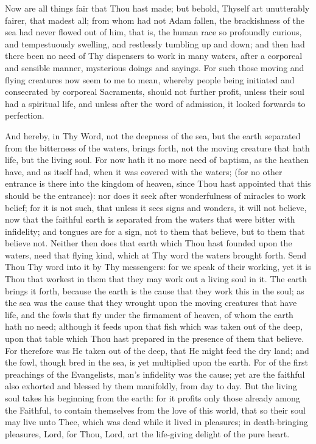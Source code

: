 \documentclass[b5paper,openright,12pt,twoside]{book}
\begin{document}
Now are all things fair that Thou hast made; but behold, Thyself art
unutterably fairer, that madest all; from whom had not Adam fallen, the
brackishness of the sea had never flowed out of him, that is, the human
race so profoundly curious, and tempestuously swelling, and restlessly
tumbling up and down; and then had there been no need of Thy dispensers
to work in many waters, after a corporeal and sensible manner,
mysterious doings and sayings. For such those moving and flying
creatures now seem to me to mean, whereby people being initiated and
consecrated by corporeal Sacraments, should not further profit, unless
their soul had a spiritual life, and unless after the word of admission,
it looked forwards to perfection.

And hereby, in Thy Word, not the deepness of the sea, but the earth
separated from the bitterness of the waters, brings forth, not the
moving creature that hath life, but the living soul. For now hath it no
more need of baptism, as the heathen have, and as itself had, when it
was covered with the waters; (for no other entrance is there into the
kingdom of heaven, since Thou hast appointed that this should be the
entrance): nor does it seek after wonderfulness of miracles to work
belief; for it is not such, that unless it sees signs and wonders, it
will not believe, now that the faithful earth is separated from the
waters that were bitter with infidelity; and tongues are for a sign, not
to them that believe, but to them that believe not. Neither then does
that earth which Thou hast founded upon the waters, need that flying
kind, which at Thy word the waters brought forth. Send Thou Thy word
into it by Thy messengers: for we speak of their working, yet it is Thou
that workest in them that they may work out a living soul in it. The
earth brings it forth, because the earth is the cause that they work
this in the soul; as the sea was the cause that they wrought upon
the moving creatures that have life, and the fowls that fly under the
firmament of heaven, of whom the earth hath no need; although it feeds
upon that fish which was taken out of the deep, upon that table which
Thou hast prepared in the presence of them that believe. For therefore
was He taken out of the deep, that He might feed the dry land; and the
fowl, though bred in the sea, is yet multiplied upon the earth. For of
the first preachings of the Evangelists, man's infidelity was the cause;
yet are the faithful also exhorted and blessed by them manifoldly, from
day to day. But the living soul takes his beginning from the earth: for
it profits only those already among the Faithful, to contain themselves
from the love of this world, that so their soul may live unto Thee,
which was dead while it lived in pleasures; in death-bringing pleasures,
Lord, for Thou, Lord, art the life-giving delight of the pure heart.
\end{document}
